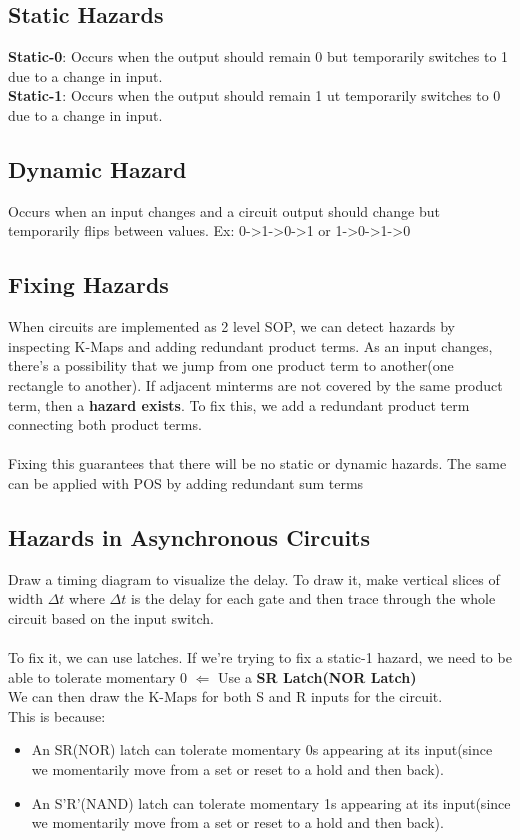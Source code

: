 \documentclass[12pt]{report}
\begin{document}
		\subsection{Static Hazards}
			\textbf{Static-0}: Occurs when the output should remain 0 but temporarily switches to 1 due to a change in input.\\
			\textbf{Static-1}: Occurs when the output should remain 1 ut temporarily switches to 0 due to a change in input.
		\subsection{Dynamic Hazard}
			Occurs when an input changes and a circuit output should change but temporarily flips between values. Ex: 0->1->0->1 or 1->0->1->0
		\subsection{Fixing Hazards}
			When circuits are implemented as 2 level SOP, we can detect hazards by inspecting K-Maps and adding redundant product terms. As an input changes, there's a possibility that we jump from one product term to another(one rectangle to another). If adjacent minterms are not covered by the same product term, then a \textbf{hazard exists}. To fix this, we add a redundant product term connecting both product terms.\\
			\\
			Fixing this guarantees that there will be no static or dynamic hazards. The same can be applied with POS by adding redundant sum terms
		\subsection{Hazards in Asynchronous Circuits}
			Draw a timing diagram to visualize the delay. To draw it, make vertical slices of width $\Delta t$ where $\Delta t$ is the delay for each gate and then trace through the whole circuit based on the input switch.\\
			\\
			To fix it, we can use latches. If we're trying to fix a static-1 hazard, we need to be able to tolerate momentary 0 $\Leftarrow$ Use a \textbf{SR Latch(NOR Latch)}\\
			We can then draw the K-Maps for both S and R inputs for the circuit.\\
			This is because:
			\begin{itemize}
				\item An SR(NOR) latch can tolerate momentary 0s appearing at its input(since we momentarily move from a set or reset to a hold and then back).
				\item An S'R'(NAND) latch can tolerate momentary 1s appearing at its input(since we momentarily move from a set or reset to a hold and then back).
			\end{itemize}
\end{document}

